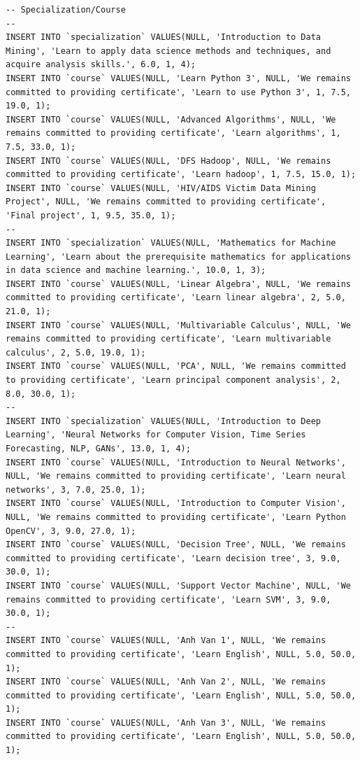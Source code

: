 \documentclass[12pt,a4paper,titlepage]{article}
\begin{document}
\begin{lstlisting}
-- Specialization/Course
--
INSERT INTO `specialization` VALUES(NULL, 'Introduction to Data Mining', 'Learn to apply data science methods and techniques, and acquire analysis skills.', 6.0, 1, 4);
INSERT INTO `course` VALUES(NULL, 'Learn Python 3', NULL, 'We remains committed to providing certificate', 'Learn to use Python 3', 1, 7.5, 19.0, 1);
INSERT INTO `course` VALUES(NULL, 'Advanced Algorithms', NULL, 'We remains committed to providing certificate', 'Learn algorithms', 1, 7.5, 33.0, 1);
INSERT INTO `course` VALUES(NULL, 'DFS Hadoop', NULL, 'We remains committed to providing certificate', 'Learn hadoop', 1, 7.5, 15.0, 1);
INSERT INTO `course` VALUES(NULL, 'HIV/AIDS Victim Data Mining Project', NULL, 'We remains committed to providing certificate', 'Final project', 1, 9.5, 35.0, 1);
--
INSERT INTO `specialization` VALUES(NULL, 'Mathematics for Machine Learning', 'Learn about the prerequisite mathematics for applications in data science and machine learning.', 10.0, 1, 3);
INSERT INTO `course` VALUES(NULL, 'Linear Algebra', NULL, 'We remains committed to providing certificate', 'Learn linear algebra', 2, 5.0, 21.0, 1);
INSERT INTO `course` VALUES(NULL, 'Multivariable Calculus', NULL, 'We remains committed to providing certificate', 'Learn multivariable calculus', 2, 5.0, 19.0, 1);
INSERT INTO `course` VALUES(NULL, 'PCA', NULL, 'We remains committed to providing certificate', 'Learn principal component analysis', 2, 8.0, 30.0, 1);
--
INSERT INTO `specialization` VALUES(NULL, 'Introduction to Deep Learning', 'Neural Networks for Computer Vision, Time Series Forecasting, NLP, GANs', 13.0, 1, 4);
INSERT INTO `course` VALUES(NULL, 'Introduction to Neural Networks', NULL, 'We remains committed to providing certificate', 'Learn neural networks', 3, 7.0, 25.0, 1);
INSERT INTO `course` VALUES(NULL, 'Introduction to Computer Vision', NULL, 'We remains committed to providing certificate', 'Learn Python OpenCV', 3, 9.0, 27.0, 1);
INSERT INTO `course` VALUES(NULL, 'Decision Tree', NULL, 'We remains committed to providing certificate', 'Learn decision tree', 3, 9.0, 30.0, 1);
INSERT INTO `course` VALUES(NULL, 'Support Vector Machine', NULL, 'We remains committed to providing certificate', 'Learn SVM', 3, 9.0, 30.0, 1);
--
INSERT INTO `course` VALUES(NULL, 'Anh Van 1', NULL, 'We remains committed to providing certificate', 'Learn English', NULL, 5.0, 50.0, 1);
INSERT INTO `course` VALUES(NULL, 'Anh Van 2', NULL, 'We remains committed to providing certificate', 'Learn English', NULL, 5.0, 50.0, 1);
INSERT INTO `course` VALUES(NULL, 'Anh Van 3', NULL, 'We remains committed to providing certificate', 'Learn English', NULL, 5.0, 50.0, 1);

\end{lstlisting}
\end{document}
